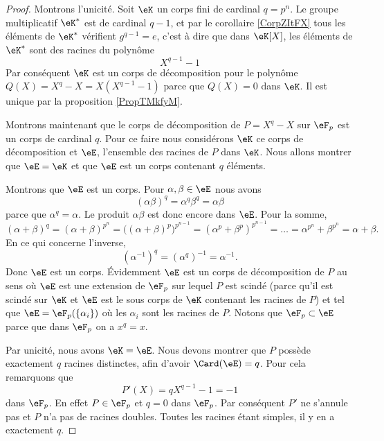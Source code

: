 \begin{proof}
    Montrons l'unicité. Soit \( \eK\) un corps fini de cardinal \( q=p^n\). Le groupe multiplicatif \( \eK^*\) est de cardinal \( q-1\), et par le corollaire \ref{CorpZItFX} tous les éléments de \( \eK^*\) vérifient \( g^{q-1}=e\), c'est à dire que dans \( \eK[X]\), les éléments de \( \eK^*\) sont des racines du polynôme
    \begin{equation}
        X^{q-1}-1
    \end{equation}
    Par conséquent \( \eK\) est un corps de décomposition pour le polynôme \( Q(X)=X^q-X=X(X^{q-1}-1)\) parce que \( Q(X)=0\) dans \( \eK\). Il est unique par la proposition \ref{PropTMkfyM}.

    Montrons maintenant que le corps de décomposition de \( P=X^q-X\) sur \( \eF_p\) est un corps de cardinal \( q\). Pour ce faire nous considérons \( \eK\) ce corps de décomposition et \(\eE\), l'ensemble des racines de \( P\) dans \( \eK\). Nous allons montrer que \( \eE=\eK\) et que \( \eE\) est un corps contenant \( q\) éléments.

    Montrons que \( \eE\) est un corps. Pour \( \alpha,\beta\in \eE\) nous avons
    \begin{equation}
        (\alpha\beta)^q=\alpha^q\beta^q=\alpha\beta
    \end{equation}
    parce que \( \alpha^q=\alpha\). Le produit \( \alpha\beta\) est donc encore dans \( \eE\). Pour la somme,
    \begin{equation}
        (\alpha+\beta)^q=(\alpha+\beta)^{p^n}=\Big( (\alpha+\beta)^p \Big)^{p^{n-1}}=(\alpha^p+\beta^p)^{p^{n-1}}=\ldots=\alpha^{p^n}+\beta^{p^n}=\alpha+\beta.
    \end{equation}
    En ce qui concerne l'inverse,
    \begin{equation}
        (\alpha^{-1})^q=(\alpha^q)^{-1}=\alpha^{-1}.
    \end{equation}
    Donc \( \eE\) est un corps. Évidemment \( \eE\) est un corps de décomposition de \( P\) au sens où \( \eE\) est une extension de \( \eF_p\) sur lequel \( P\) est scindé (parce qu'il est scindé sur \( \eK\) et \( \eE\) est le sous corps de \( \eK\) contenant les racines de \( P\)) et tel que \( \eE=\eF_p(\{ \alpha_i \})\) où les \( \alpha_i\) sont les racines de \( P\). Notons que \( \eF_p\subset \eE\) parce que dans \( \eF_p\) on a \( x^q=x\).

    Par unicité, nous avons \( \eK=\eE\). Nous devons montrer que \( P\) possède exactement \( q\) racines distinctes, afin d'avoir \( \Card(\eE)=q\). Pour cela remarquons que 
    \begin{equation}
        P'(X)=qX^{q-1}-1=-1
    \end{equation}
    dans \( \eF_p\). En effet \( P\in\eF_p\) et \( q=0\) dans \( \eF_p\). Par conséquent \( P'\) ne s'annule pas et \( P\) n'a pas de racines doubles. Toutes les racines étant simples, il y en a exactement \( q\).

\end{proof}

